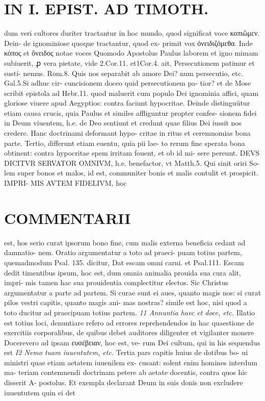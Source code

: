\documentclass{article}
\begin{document}
\begin{pages}
\section*{IN I. EPIST. AD TIMOTH. }
\marginpar{[ p.103 ]}\pstart dum veri cultores duriter tractantur in hoc mundo, quod significat voce κοπιῶμεν. Dein- de ignominiose quoque tractantur, quod ex- primit vox ὀνειδιζόμεθα. Inde κόπος et ὄνειδος notae voces  \pend\pstart Quomodo Apostolus Paulus laborem et igno mimam subiuerit, ꝓ vera pietate, vide 2.Cor.11. et1Cor.4. ait, Persecutionem patimur et susti- nemus. Rom.8. Quis nos separabit ab amore Dei? num persecutio, etc. Gal.5.Si adhuc cir- cuncisionem doceo quid persecutionem pa- tior? et de Mose scribit epistola ad Hebr.11. quod maluerit cum populo Dei ignominia affici, quam gloriose viuere apud Aegyptios: contra faciunt hypocritae.  \pend\pstart Deinde distinguütur etiam causa crucis, quia Paulus et similes affliguntur propter confes- sionem fidei in Deum viuentem, h.e. de Deo sentiunt et credunt quae filius Dei iussit nos credere. Hanc doctrinami deformant hypo- critae in ritus et ceremnomias bona parte.  \pend\pstart Tertio, differunt etiam euentu, quia pii lae- to rerum fine sperata bona obtinent: contra hypocritae spem irritam fouent, et ob id mi- sere pereunt.  \pend\pstart DEVS DICITVR SERVATOR OMNIVM, h.e. benefactor, vt Matth.5. Qui sinit oriri So- lem super bonos et malos, id est, communiter bonis et malis contulit et prospicit. IMPRI- MIS AVTEM FIDELIVM, hoc  \pend
\marginpar{[ p.104 ]}
\section*{COMMENTARII }\pstart est, hos serio curat ipsorum bono fine, cum malis externa beneficia cedant ad damnatio- nem. Oratio argumentatur a toto ad praeci- puam totius partem, quemadmodum Psal. 135. dicitur, Dat escam omni carni. et Psal.111. Escam dedit timentibus ipsum, hoc est, dum omnia animalia prouida sua cura alit, impri- mis tamen hac sua prouidentia complectitur electos. Sic Christus argumentatur a parte ad partem. Si curae sunt ei aues, quanto magis nos: si curat pilos vestri capitis, quanto magis ani- mas nostras? simile est hoc, nisi quod a toto ducitur ad praecipuam totius partem.  \pend
\textit{11 Annuntia haec et doce, etc. }\pstart Illatio est totius loci, denuntiare refero ad errores reprehendendos in hac quaestione de exercitiis corporalibus, de quibus debet auditores diligenter et vigilanter monere  \pend\pstart Docerevero ad ipsam ευσέβειαν, hoc est, ve- rum Dei cultum, qui in his sequendus est  \pend
\textit{I2 Nemo tuam iuuentutem, etc. }\pstart Tertia pars capitis huius de dotibus bo- ui ministri quae etiam aetatem iuuenilem ex- cusant: solent enim homines interdum ma- teriam contemnendi doctrinam petere ab aetate docentis, contra quos hic disserit A- postolus. Et exempla declarant Deum in suis donis non excludere iuuentutem quin ei det  \pend

\end{pages}
\end{document}
